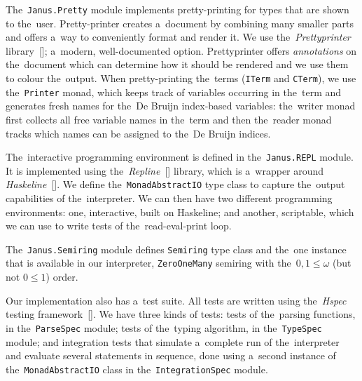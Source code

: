 The~\texttt{Janus.Pretty} module implements pretty-printing for types that are
shown to the~user. Pretty-printer creates a~document by combining many smaller
parts and offers a~way to conveniently format and render it. We use
the~\emph{Prettyprinter} library~[\citeauthor{prettyprinter}]; a~modern,
well-documented option. Prettyprinter offers \emph{annotations} on the~document
which can determine how it should be rendered and we use them to colour
the~output. When pretty-printing the~terms (\texttt{ITerm} and \texttt{CTerm}),
we use the~\texttt{Printer} monad, which keeps track of variables occurring in
the~term and generates fresh names for the~De Bruijn index-based variables:
the~writer monad first collects all free variable names in the~term and then
the~reader monad tracks which names can be assigned to the~De Bruijn indices.

The~interactive programming environment is defined in the~\texttt{Janus.REPL}
module. It is implemented using
the~\emph{Repline}~[\citeauthor{repline}] library, which is a~wrapper around
\emph{Haskeline}~[\citeauthor{haskeline}]. We define
the~\texttt{MonadAbstractIO} type class to capture the~output capabilities of
the~interpreter. We can then have two different programming environments: one,
interactive, built on Haskeline; and another, scriptable, which we can use to
write tests of the~read-eval-print loop.

The~\texttt{Janus.Semiring} module defines \texttt{Semiring} type class and
the~one instance that is available in our interpreter, \texttt{ZeroOneMany}
semiring with the~$0, 1 \leq \omega$ (but not $0 \leq 1$) order.

Our implementation also has a~test suite. All tests are written using
the~\emph{Hspec} testing framework~[\citeauthor{hspec}]. We have three kinds of
tests: tests of the~parsing functions, in the~\texttt{ParseSpec} module; tests
of the~typing algorithm, in the~\texttt{TypeSpec} module; and integration tests
that simulate a~complete run of the~interpreter and evaluate several statements
in sequence, done using a~second instance of the~\texttt{MonadAbstractIO} class
in the~\texttt{IntegrationSpec} module.


